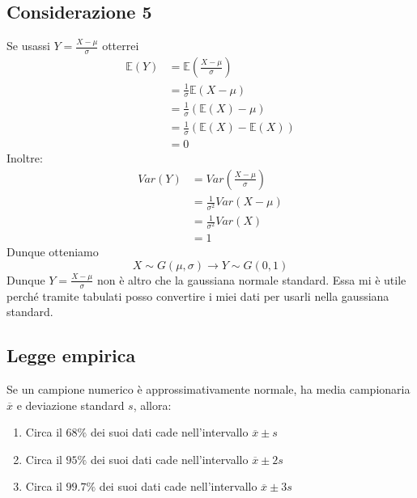\documentclass[11pt]{report}
\begin{document}
\subsection{Considerazione 5}
Se usassi $Y = \frac{X-\mu}{\sigma}$ otterrei
\begin{equation}
    \begin{split}
        \mathbb{E}(Y) & = \mathbb{E}\left( \frac{X-\mu}{\sigma} \right)\\
        & = \frac{1}{\sigma} \mathbb{E}(X-\mu)\\
        & = \frac{1}{\sigma} \left( \mathbb{E}(X)  -\mu \right)\\
        & = \frac{1}{\sigma} \left( \mathbb{E}(X) - \mathbb{E}(X) \right)\\
        & = 0
    \end{split}
\end{equation}
Inoltre:
\begin{equation}
    \begin{split}
        Var(Y) & = Var \left( \frac{X-\mu}{\sigma} \right)\\
        & = \frac{1}{\sigma^2} Var(X-\mu)\\
        & = \frac{1}{\sigma^2} Var(X)\\
        & = 1
    \end{split}
\end{equation}
Dunque otteniamo
\begin{equation}
    X \sim G(\mu,\sigma) \rightarrow Y \sim G(0,1)
\end{equation}
Dunque $Y = \frac{X-\mu}{\sigma}$ non è altro che la gaussiana normale standard. Essa mi è utile perché tramite tabulati posso convertire i miei dati per usarli nella gaussiana standard.
\subsection{Legge empirica}
Se un campione numerico è approssimativamente normale, ha media campionaria $\overline{x}$ e deviazione standard $s$, allora:
\begin{enumerate}
	\item Circa il $68\%$ dei suoi dati cade nell'intervallo $\overline{x} \pm s$
	\item Circa il $95\%$ dei suoi dati cade nell'intervallo $\overline{x} \pm 2s$
	\item Circa il $99.7\%$ dei suoi dati cade nell'intervallo $\overline{x} \pm 3s$
\end{enumerate}
\end{document}
